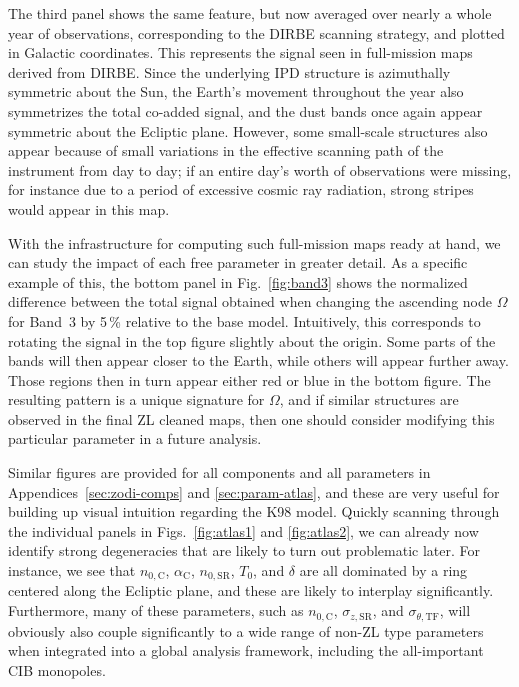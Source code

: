 \documentclass[twocolumn]{aa}
\begin{document}
The third panel shows the same feature, but now averaged over nearly
a whole year of observations, corresponding to the DIRBE scanning 
strategy, and plotted in Galactic coordinates. This
represents the signal seen in full-mission maps derived from
DIRBE. Since the underlying IPD structure is azimuthally symmetric
about the Sun, the Earth's movement throughout the year also
symmetrizes the total co-added signal, and the dust bands once again
appear symmetric about the Ecliptic plane. However, some small-scale
structures also appear because of small variations in the effective
scanning path of the instrument from day to day; if an entire day's
worth of observations were missing, for instance due to a period of
excessive cosmic ray radiation, strong stripes would appear in this
map.

With the infrastructure for computing such full-mission maps ready at
hand, we can study the impact of each free parameter in greater
detail. As a specific example of this, the bottom panel in
Fig.~\ref{fig:band3} shows the normalized difference between the total signal
obtained when changing the ascending node $\Omega$ for Band~3 by 5\,\%
relative to the base model. Intuitively, this corresponds to rotating
the signal in the top figure slightly about the origin. Some parts of
the bands will then appear closer to the Earth, while others will
appear further away. Those regions then in turn appear either red or
blue in the bottom figure. The resulting pattern is a unique
signature for $\Omega$, and if similar structures are observed in the
final ZL cleaned maps, then one should consider modifying this
particular parameter in a future analysis.

Similar figures are provided for all components and all parameters in
Appendices~\ref{sec:zodi-comps} and \ref{sec:param-atlas}, and these
are very useful for building up visual intuition regarding the K98
model. Quickly scanning through the individual panels in
Figs.~\ref{fig:atlas1} and \ref{fig:atlas2}, we can already now
identify strong degeneracies that are likely to turn out problematic
later. For instance, we see that $n_{0,\mathrm{C}}$,
$\alpha_\mathrm{C}$, $n_{0,\mathrm{SR}}$, $T_0$, and $\delta$ are all
dominated by a ring centered along the Ecliptic plane, and these are
likely to interplay significantly. Furthermore, many of these
parameters, such as $n_{0,\mathrm{C}}$, $\sigma_{z,\mathrm{SR}}$, and
$\sigma_{\theta,\mathrm{TF}}$, will obviously also couple
significantly to a wide range of non-ZL type parameters when
integrated into a global analysis framework, including the
all-important CIB monopoles.
\end{document}

